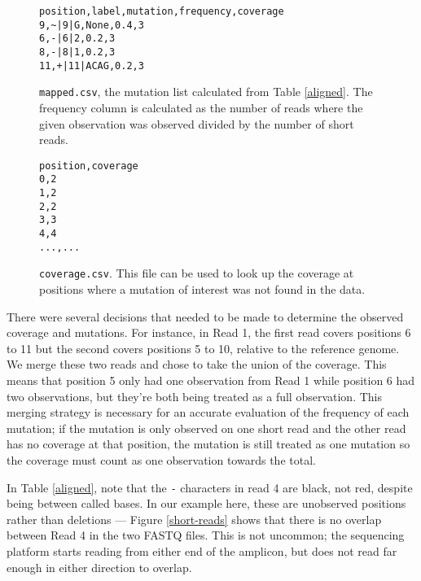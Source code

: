 \documentclass{article}
\begin{document}
\begin{figure}[h!]
\begin{verbatim}
position,label,mutation,frequency,coverage
9,~|9|G,None,0.4,3
6,-|6|2,0.2,3
8,-|8|1,0.2,3
11,+|11|ACAG,0.2,3
\end{verbatim}
\caption{\texttt{mapped.csv}, the mutation list calculated from Table \ref{aligned}.
The frequency column is calculated as the number of reads where the given observation was observed divided by the number of short reads.}
\label{mapped}
\end{figure}

\begin{figure}[h!]
\begin{verbatim}
position,coverage
0,2
1,2
2,2
3,3
4,4
...,...
\end{verbatim}
\caption{\texttt{coverage.csv}. 
This file can be used to look up the coverage at positions where a mutation of interest was not found in the data.}
\label{coverage}
\end{figure}

There were several decisions that needed to be made to determine the observed coverage and mutations.
For instance, in Read 1, the first read covers positions 6 to 11 but the second covers positions 5 to 10, relative to the reference genome.
We merge these two reads and chose to take the union of the coverage.
This means that position 5 only had one observation from Read 1 while position 6 had two observations, but they're both being treated as a full observation.
This merging strategy is necessary for an accurate evaluation of the frequency of each mutation; if the mutation is only observed on one short read and the other read has no coverage at that position, the mutation is still treated as one mutation so the coverage must count as one observation towards the total.

In Table \ref{aligned}, note that the \texttt{-} characters in read 4 are black, not red, despite being between called bases.
In our example here, these are unobserved positions rather than deletions --- Figure \ref{short-reads} shows that there is no overlap between Read 4 in the two FASTQ files.
This is not uncommon; the sequencing platform starts reading from either end of the amplicon, but does not read far enough in either direction to overlap.
\end{document}
